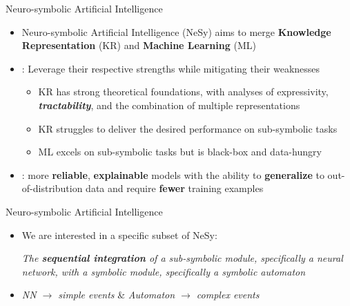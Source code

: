 \documentclass[10pt, aspectratio=169]{beamer}
\begin{document}
\begin{frame}{Neuro-symbolic Artificial Intelligence}
    \begin{itemize}
        \setlength{\itemsep}{13pt}
        \item Neuro-symbolic Artificial Intelligence (NeSy) aims to merge \textbf{Knowledge Representation} (KR) and \textbf{Machine Learning} (ML)
        \item {}: Leverage their respective strengths while mitigating their weaknesses
        \vspace{0.6em}
        \begin{itemize}
            \setlength{\itemsep}{4pt}
                \item KR has \textcolor{green!70!black}{strong theoretical foundations}, with analyses of expressivity, \textbf{\textit{tractability}}, and the combination of multiple representations
                \item KR struggles to deliver the desired  \textcolor{red!90!black}{performance} on sub-symbolic tasks
                \item ML excels on \textcolor{green!70!black}{sub-symbolic tasks} but is \textcolor{red!90!black}{black-box} and \textcolor{red!90!black}{data-hungry}
            \end{itemize}
        \item {}: more \textbf{reliable}, \textbf{explainable} models with the ability to \textbf{generalize} to out-of-distribution data and require \textbf{fewer} training examples
    \end{itemize}
\end{frame}

\begin{frame}{Neuro-symbolic Artificial Intelligence}
    \begin{itemize}
        \setlength{\itemsep}{12pt}
        \item We are interested in a specific subset of NeSy:
        \vspace{1em}
        \begin{center}
            \textit{The \textbf{sequential integration} of a sub-symbolic module, specifically a neural network, with a symbolic module, specifically a symbolic automaton}
        \end{center}
        \item {} \textit{NN $\rightarrow$ simple events} \&  \textit{Automaton $\rightarrow$ complex events}
    \end{itemize}
\end{frame}
\end{document}
